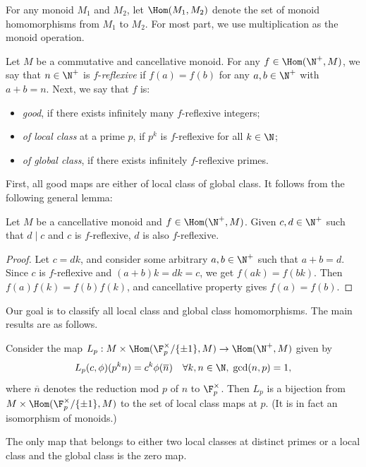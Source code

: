 For any monoid $M_1$ and $M_2$, let $\Hom(M_1, M_2)$ denote the set of monoid homomorphisms from $M_1$ to $M_2$.
For most part, we use multiplication as the monoid operation.

Let $M$ be a commutative and cancellative monoid.
For any $f \in \Hom(\N^+, M)$, we say that $n \in \N^+$ is $f$-\emph{reflexive} if $f(a) = f(b)$ for any $a, b \in \N^+$ with $a + b = n$.
Next, we say that $f$ is:
\begin{itemize}
    \item   \emph{good}, if there exists infinitely many $f$-reflexive integers;
    \item   \emph{of local class} at a prime $p$, if $p^k$ is $f$-reflexive for all $k \in \N$;
    \item   \emph{of global class}, if there exists infinitely $f$-reflexive primes.
\end{itemize}

First, all good maps are either of local class of global class.
It follows from the following general lemma:

\begin{lemma}
Let $M$ be a cancellative monoid and $f \in \Hom(\N^+, M)$.
Given $c, d \in \N^+$ such that $d \mid c$ and $c$ is $f$-reflexive, $d$ is also $f$-reflexive.
\end{lemma}
\begin{proof}
Let $c = dk$, and consider some arbitrary $a, b \in \N^+$ such that $a + b = d$.
Since $c$ is $f$-reflexive and $(a + b) k = dk = c$, we get $f(ak) = f(bk)$.
Then $f(a) f(k) = f(b) f(k)$, and cancellative property gives $f(a) = f(b)$.
\end{proof}

Our goal is to classify all local class and global class homomorphisms.
The main results are as follows.

\begin{theorem}\label{2020n5-main1}
Consider the map $L_p : M \times \Hom(\F_p^{\times}/\{\pm 1\}, M) \to \Hom(\N^+, M)$ given by
\[ L_p(c, \phi)(p^k n) = c^k \phi(\overline{n}) \quad \forall k, n \in \N, \; \gcd(n, p) = 1, \]
    where $\overline{n}$ denotes the reduction mod $p$ of $n$ to $\F_p^{\times}$.
Then $L_p$ is a bijection from $M \times \Hom(\F_p^{\times}/\{\pm 1\}, M)$ to the set of local class maps at $p$.
(It is in fact an isomorphism of monoids.)
\end{theorem}

\begin{theorem}\label{2020n5-main2}
The only map that belongs to either two local classes at distinct primes or a local class and the global class is the zero map.
\end{theorem}

